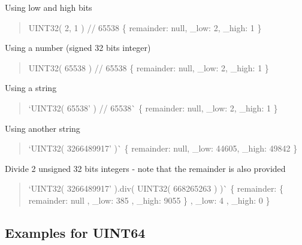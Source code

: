 \begin{DoxyItemize}
\item Using low and high bits \begin{quote}
{\ttfamily U\+I\+N\+T32( 2, 1 ) // 65538} \{ remainder\+: null, \+\_\+low\+: 2, \+\_\+high\+: 1 \} \end{quote}

\item Using a number (signed 32 bits integer) \begin{quote}
{\ttfamily U\+I\+N\+T32( 65538 ) // 65538} \{ remainder\+: null, \+\_\+low\+: 2, \+\_\+high\+: 1 \} \end{quote}

\item Using a string \begin{quote}
`U\+I\+N\+T32( \textquotesingle{}65538' ) // 65538\`{} \{ remainder\+: null, \+\_\+low\+: 2, \+\_\+high\+: 1 \} \end{quote}

\item Using another string \begin{quote}
`U\+I\+N\+T32( \textquotesingle{}3266489917' )\`{} \{ remainder\+: null, \+\_\+low\+: 44605, \+\_\+high\+: 49842 \} \end{quote}

\item Divide 2 unsigned 32 bits integers -\/ note that the remainder is also provided \begin{quote}
`U\+I\+N\+T32( \textquotesingle{}3266489917' ).div( U\+I\+N\+T32( \textquotesingle{}668265263\textquotesingle{} ) )\`{} \{ remainder\+: \{ remainder\+: null , \+\_\+low\+: 385 , \+\_\+high\+: 9055 \} , \+\_\+low\+: 4 , \+\_\+high\+: 0 \} \end{quote}

\end{DoxyItemize}

\subsection*{Examples for U\+I\+N\+T64}


